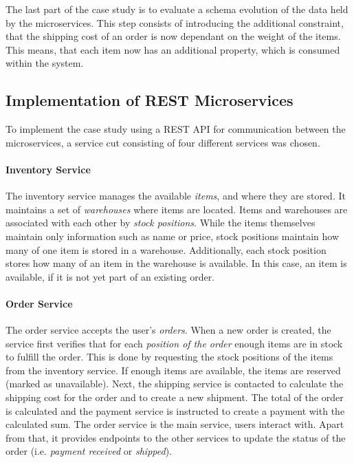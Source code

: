 The last part of the case study is to evaluate a schema evolution of the data held by the microservices.
This step consists of introducing the additional constraint, that the shipping cost of an order is now dependant on the weight of the items.
This means, that each item now has an additional property, which is consumed within the system.

\subsection{Implementation of \acs{REST} Microservices}\label{sec:cs-rest}

To implement the case study using a \ac{REST} \ac{API} for communication between the microservices, a service cut consisting of four different services was chosen.

\paragraph{Inventory Service}

The inventory service manages the available \textit{items}, and where they are stored.
It maintains a set of \textit{warehouses} where items are located.
Items and warehouses are associated with each other by \textit{stock positions}.
While the items themselves maintain only information such as name or price, stock positions maintain how many of one item is stored in a warehouse.
Additionally, each stock position stores how many of an item in the warehouse is available.
In this case, an item is available, if it is not yet part of an existing order.

\paragraph{Order Service}

The order service accepts the user's \textit{orders}.
When a new order is created, the service first verifies that for each \textit{position of the order} enough items are in stock to fulfill the order.
This is done by requesting the stock positions of the items from the inventory service.
If enough items are available, the items are reserved (marked as unavailable).
Next, the shipping service is contacted to calculate the shipping cost for the order and to create a new shipment.
The total of the order is calculated and the payment service is instructed to create a payment with the calculated sum.
The order service is the main service, users interact with.
Apart from that, it provides endpoints to the other services to update the status of the order (i.e. \textit{payment received} or \textit{shipped}).

